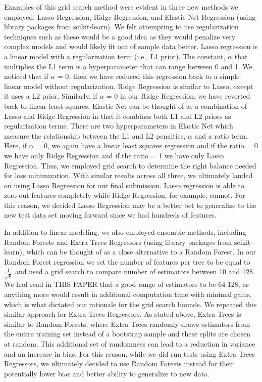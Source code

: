 \documentclass[11pt, oneside]{article}   	%
\begin{document}
Examples of this grid search method were evident in three new methods we employed: Lasso Regression, Ridge Regression, and Elastic Net Regression (using library packages from scikit-learn). We felt attempting to use regularization techniques such as these would be a good idea as they would penalize very complex models and would likely fit out of sample data better. Lasso regression is a linear model with a regularization term (i.e., L1 prior). The constant, $\alpha$ that multiplies the L1 term is a hyperparameter that can range between 0 and 1. We noticed that if $\alpha$ = 0, then we have reduced this regression back to a simple linear model without regularization. Ridge Regression is similar to Lasso, except it uses a L2 prior. Similarly, if $\alpha$ = 0 in our Ridge Regression, we have reverted back to linear least squares. Elastic Net can be thought of as a combination of Lasso and Ridge Regression in that it combines both L1 and L2 priors as regularization terms. There are two hyperparameters in Elastic Net which measure the relationship between the L1 and L2 penalties, $\alpha$ and a ratio term. Here, if $\alpha$ = 0, we again have a linear least squares regression and if the ratio = 0 we have only Ridge Regression and if the ratio = 1 we have only Lasso Regression. Thus, we employed grid search to determine the right balance needed for loss minimization. With similar results across all three, we ultimately landed on using Lasso Regression for our final submission. Lasso regression is able to zero out features completely while Ridge Regression, for example, cannot. For this reason, we decided Lasso Regression may be a better bet to generalize to the new test data set moving forward since we had hundreds of features. 

In addition to linear modeling, we also employed ensemble methods, including Random Forests and Extra Trees Regressors (using library packages from scikit-learn), which can be thought of as a close alternative to a Random Forest. In our Random Forest regression we set the number of features per tree to be equal to $\frac{1}{\sqrt{p}}$ and used a grid search to compare number of estimators between 10 and 128. We had read in THIS PAPER that a good range of estimators to be 64-128, as anything more would result in additional computation time with minimal gains, which is what dictated our rationale for the grid search bounds. We repeated this similar approach for Extra Trees Regressors. As stated above, Extra Trees is similar to Random Forests, where Extra Trees randomly draws estimators from the entire training set instead of a bootstrap sample and these splits are chosen at random. This additional set of randomness can lead to a reduction in variance and an increase in bias. For this reason, while we did run tests using Extra Trees Regressors, we ultimately decided to use Random Forests instead for their potentially lower bias and better ability to generalize to new data. 
\end{document}
